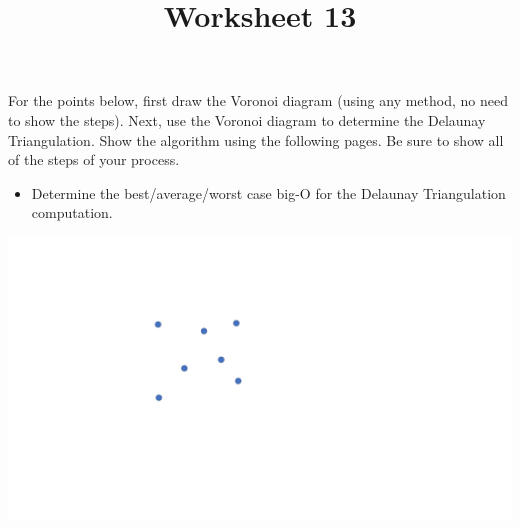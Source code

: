 \documentclass[a4paper,12pt]{article}
\title{Worksheet 13}
\begin{document}
\maketitle

\worksheetGroundRules

\worksheetSubmission

\assignmentInstructions

For the points below, first draw the Voronoi diagram (using any method, no need to show the steps). Next, use the Voronoi diagram to determine the Delaunay Triangulation. Show the algorithm using the following pages. Be sure to show all of the steps of your process.

\begin{itemize}
\item Determine the best/average/worst case big-O for the Delaunay Triangulation computation.


\end{itemize}


\begin{center}
\includegraphics[width=0.65\linewidth]{../images/voronoi7.pdf}
\end{center}



\newpage
\end{document}
